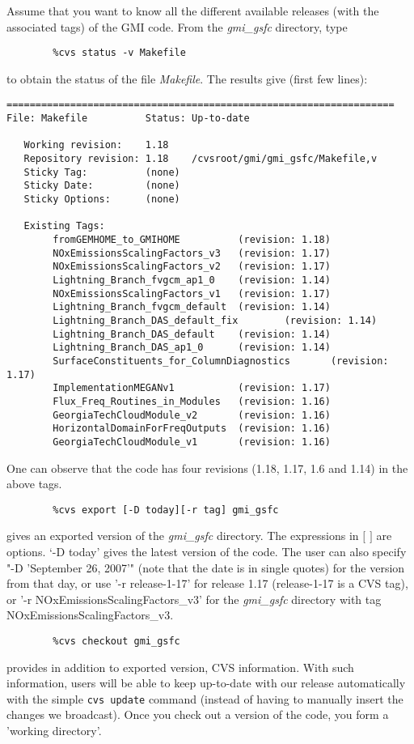 Assume that you want to know all the different available releases 
(with the associated tags) of the GMI code.
From the {\em gmi\_gsfc} directory, type
%
\begin{verbatim}
        %cvs status -v Makefile
\end{verbatim}
%
to obtain the status of the file {\em Makefile}.
The results give (first few lines):
%
\begin{verbatim}
===================================================================
File: Makefile          Status: Up-to-date

   Working revision:    1.18
   Repository revision: 1.18    /cvsroot/gmi/gmi_gsfc/Makefile,v
   Sticky Tag:          (none)
   Sticky Date:         (none)
   Sticky Options:      (none)

   Existing Tags:
        fromGEMHOME_to_GMIHOME          (revision: 1.18)
        NOxEmissionsScalingFactors_v3   (revision: 1.17)
        NOxEmissionsScalingFactors_v2   (revision: 1.17)
        Lightning_Branch_fvgcm_ap1_0    (revision: 1.14)
        NOxEmissionsScalingFactors_v1   (revision: 1.17)
        Lightning_Branch_fvgcm_default  (revision: 1.14)
        Lightning_Branch_DAS_default_fix        (revision: 1.14)
        Lightning_Branch_DAS_default    (revision: 1.14)
        Lightning_Branch_DAS_ap1_0      (revision: 1.14)
        SurfaceConstituents_for_ColumnDiagnostics       (revision: 1.17)
        ImplementationMEGANv1           (revision: 1.17)
        Flux_Freq_Routines_in_Modules   (revision: 1.16)
        GeorgiaTechCloudModule_v2       (revision: 1.16)
        HorizontalDomainForFreqOutputs  (revision: 1.16)
        GeorgiaTechCloudModule_v1       (revision: 1.16)
\end{verbatim}
%
One can observe that the code has four revisions (1.18, 1.17, 1.6 and 1.14)
in the above tags.
%
\begin{verbatim}
        %cvs export [-D today][-r tag] gmi_gsfc
\end{verbatim}
%
gives an exported version of the {\em gmi\_gsfc} directory.
The expressions in $[$ $]$ are options.
`-D today' gives the latest version of the code.
The user can also specify "-D 'September 26, 2007'" (note that the date is in single quotes)
for the version from that day, or use '-r release-1-17' for release 1.17
(release-1-17 is a CVS tag), or '-r NOxEmissionsScalingFactors\_v3' for the
{\em gmi\_gsfc} directory with tag NOxEmissionsScalingFactors\_v3.

\begin{verbatim}
        %cvs checkout gmi_gsfc
\end{verbatim}
%
provides in addition to exported version, CVS information.
With such information, users will be able to keep up-to-date with our release
automatically with the simple {\tt cvs update} command (instead of having to manually
insert the changes we broadcast).
Once you check out a version of the code, you form a 'working directory'.

